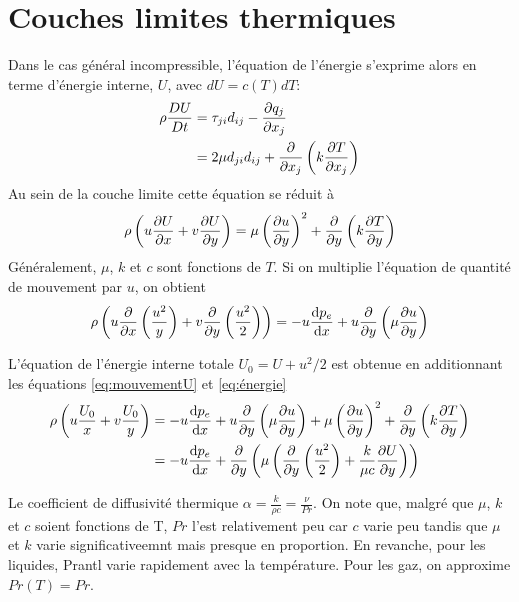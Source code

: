   \section{Couches limites thermiques}
    Dans le cas général incompressible, l'équation de l'énergie s'exprime alors en terme d'énergie interne, $U$, avec $dU = c(T)dT$:
    \begin{equation}\label{eq:énergie}
      \begin{aligned}
        \rho \frac{D U}{D t} &= \tau_{ji}d_{ij} - \pdv{q_j}{x_j}\\
        &= 2 \mu d_{ji}d_{ij} + \pdv{x_j}\left(k \pdv{T}{x_j}\right)
      \end{aligned}
    \end{equation}
    Au sein de la couche limite cette équation se réduit à
    \begin{equation}
      \rho \left(u\pdv{U}{x} + v\pdv{U}{y}\right) = \mu \left(\pdv{u}{y}\right)^2 + \pdv{y}\left(k\pdv{T}{y}\right)
    \end{equation}
    Généralement, $\mu$, $k$ et $c$ sont fonctions de $T$. Si on multiplie l'équation de quantité de mouvement par $u$, on obtient
    \begin{equation}\label{eq:mouvementU}
      \rho \left(u\pdv{x}\left(\frac{u^2}{y}\right) + v\pdv{y}\left(\frac{u^2}{2}\right)\right) = -u \dv{p_e}{x} + u \pdv{y}\left(\mu \pdv{u}{y}\right)
    \end{equation}

    L'équation de l'énergie interne totale $U_0 = U + u^2/2$ est obtenue en additionnant les équations \ref{eq:mouvementU} et \ref{eq:énergie}
    \begin{equation}
      \begin{aligned}
        \rho \left(u\frac{U_0}{x} + v\frac{U_0}{y}\right) &= -u \dv{p_e}{x} + u \pdv{y}\left(\mu \pdv{u}{y}\right) + \mu \left(\pdv{u}{y}\right)^2 + \pdv{y} \left(k \pdv{T}{y}\right)\\
        &= -u \dv{p_e}{x} + \pdv{y} \left(\mu \left(\pdv{y}\left(\frac{u^2}{2}\right) + \frac{k}{\mu c} \pdv{U}{y}\right)\right)
      \end{aligned}
    \end{equation}

    Le coefficient de diffusivité thermique $\alpha = \frac{k}{\rho c} = \frac{\nu}{Pr}$. On note que, malgré que $\mu$, $k$ et $c$ soient fonctions de T, $Pr$ l'est relativement peu car $c$ varie peu tandis que $\mu$ et $k$ varie significativeemnt mais presque en proportion. En revanche, pour les liquides, Prantl varie rapidement avec la température. Pour les gaz, on approxime $Pr(T)=Pr$.

